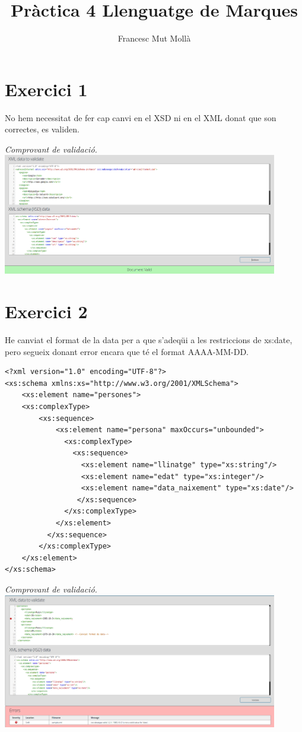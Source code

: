 \documentclass{article}
\title{Pràctica 4 Llenguatge de Marques}
\author{Francesc Mut Mollà}
\begin{document}
\maketitle
\newpage
\section{Exercici 1}
No hem necessitat de fer cap canvi en el XSD ni en el XML donat que son correctes, es validen.
\vspace{3cm}
\begin{center}
\textit{Comprovant de validació.}
\includegraphics[width=12cm]{validacio1.png}
\end{center}

\newpage


\section{Exercici 2}
He canviat el format de la data per a que s'adeqüi a les restriccions de xs:date, pero segueix donant error encara que té el format AAAA-MM-DD.
\begin{verbatim}
<?xml version="1.0" encoding="UTF-8"?>
<xs:schema xmlns:xs="http://www.w3.org/2001/XMLSchema">
    <xs:element name="persones">
    <xs:complexType>
        <xs:sequence>
            <xs:element name="persona" maxOccurs="unbounded">
              <xs:complexType>
                <xs:sequence>
                  <xs:element name="llinatge" type="xs:string"/>
                  <xs:element name="edat" type="xs:integer"/>
                  <xs:element name="data_naixement" type="xs:date"/>
                 </xs:sequence>
              </xs:complexType>
            </xs:element>
          </xs:sequence>
        </xs:complexType>
    </xs:element>
</xs:schema>
\end{verbatim}
\vspace{0,5cm}
\begin{center}
    \textit{Comprovant de validació.}
    \includegraphics[width=12cm]{validacio2.png}
\end{center}
    
\end{document}
